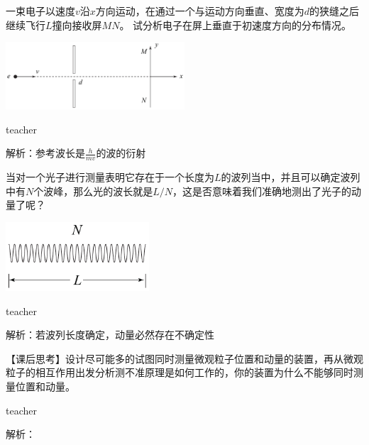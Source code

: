\begin{example}
一束电子以速度$v$沿$x$方向运动，在通过一个与运动方向垂直、宽度为$d$的狭缝之后继续飞行$L$撞向接收屏$MN$。
试分析电子在屏上垂直于初速度方向的分布情况。
\begin{flushright}
\includegraphics[width = 0.5\textwidth]{images/particle-9.pdf} 
\end{flushright}

\begin{taggedblock}{teacher}

解析：参考波长是$\frac{h}{mv}$的波的衍射
\end{taggedblock}
\end{example}



\begin{example}
当对一个光子进行测量表明它存在于一个长度为$L$的波列当中，并且可以确定波列中有$N$个波峰，那么光的波长就是$L/N$，这是否意味着我们准确地测出了光子的动量了呢？
\begin{flushright}
\includegraphics[width = 0.4\textwidth]{images/particle-10.pdf} 
\end{flushright}


\begin{taggedblock}{teacher}

解析：若波列长度确定，动量必然存在不确定性
\end{taggedblock}
\end{example}

\begin{example}
【课后思考】设计尽可能多的试图同时测量微观粒子位置和动量的装置，再从微观粒子的相互作用出发分析测不准原理是如何工作的，你的装置为什么不能够同时测量位置和动量。

\begin{taggedblock}{teacher}

解析：
\end{taggedblock}
\end{example}


